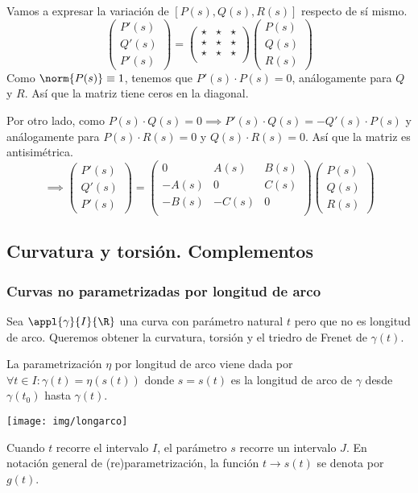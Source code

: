 Vamos a expresar la variación de $[P(s), Q(s), R(s)]$ respecto de sí mismo.
\[\begin{pmatrix}
	P'(s) \\ Q'(s) \\ P'(s)
\end{pmatrix} = \begin{pmatrix}
	\star & \star & \star \\
	\star & \star & \star \\
	\star & \star & \star \\
\end{pmatrix}\begin{pmatrix}
	P(s) \\ Q(s) \\ R(s)
\end{pmatrix}\]
Como $\norm{P(s)}\equiv1$, tenemos que $P'(s)\cdot P(s)=0$, análogamente para $Q$ y $R$. Así que la matriz tiene ceros en la diagonal.

Por otro lado, como $P(s)\cdot Q(s)=0 \implies P'(s)\cdot Q(s)=-Q'(s)\cdot P(s)$ y análogamente para $P(s)\cdot R(s)=0$ y $Q(s)\cdot R(s)=0$. Así que la matriz es antisimétrica.
\[\implies \begin{pmatrix}
	P'(s) \\ Q'(s) \\ P'(s)
\end{pmatrix} = \begin{pmatrix}
	0 & A(s) & B(s) \\
	-A(s) & 0 & C(s) \\
	-B(s) & -C(s) & 0 \\
\end{pmatrix}\begin{pmatrix}
	P(s) \\ Q(s) \\ R(s)
\end{pmatrix}\]

\subsection{Curvatura y torsión. Complementos}
\subsubsection{Curvas no parametrizadas por longitud de arco}
Sea $\appl{\gamma}{I}{\R}$ una curva con parámetro natural $t$ pero que no es longitud de arco. Queremos obtener la curvatura, torsión y el triedro de Frenet de $\gamma(t)$.

La parametrización $\eta$ por longitud de arco viene dada por $\forall t \in I : \gamma(t) = \eta(s(t))$ donde $s=s(t)$ es la longitud de arco de $\gamma$ desde $\gamma(t_0)$ hasta $\gamma(t)$.
\begin{center}
	\texttt{[image: img/longarco]}	
\end{center}
Cuando $t$ recorre el intervalo $I$, el parámetro $s$ recorre un intervalo $J$. En notación general de (re)parametrización, la función $t \to s(t)$ se denota por $g(t)$.

